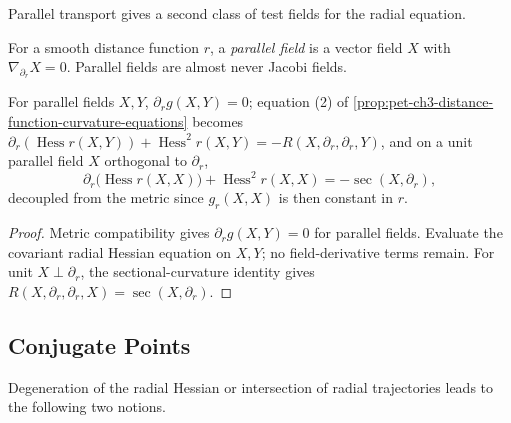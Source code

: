 Parallel transport gives a second class of test fields for the radial equation.

\begin{definition}
  \label{def:pet-ch3-parallel-field}
  \leanok
  For a smooth distance function $r$, a \emph{parallel field} is a vector field
  $X$ with $\nabla_{\partial_r}X=0$. Parallel fields are almost never Jacobi
  fields.
\end{definition}

\begin{proposition}
  \label{prop:pet-ch3-parallel-field-curvature-equation}
  \leanok
  For parallel fields $X,Y$, $\partial_rg(X,Y)=0$; equation (2) of
  \cref{prop:pet-ch3-distance-function-curvature-equations} becomes
  $\partial_r(\operatorname{Hess}r(X,Y))+\operatorname{Hess}^2r(X,Y)=-R(X,\partial_r,\partial_r,Y)$,
  and on a unit parallel field $X$ orthogonal to $\partial_r$,
  \[
    \partial_r\big(\operatorname{Hess}r(X,X)\big)+\operatorname{Hess}^2r(X,X)=-\sec(X,\partial_r),
  \]
  decoupled from the metric since $g_r(X,X)$ is then constant in $r$.
\end{proposition}
\begin{proof}
  \leanok
  \sketch
  Metric compatibility gives $\partial_rg(X,Y)=0$ for parallel fields. Evaluate
  the covariant radial Hessian equation on $X,Y$; no field-derivative terms remain.
  For unit $X\perp\partial_r$, the sectional-curvature identity gives
  $R(X,\partial_r,\partial_r,X)=\sec(X,\partial_r)$.
\end{proof}

\subsection{Conjugate Points}

Degeneration of the radial Hessian or intersection of radial trajectories leads
to the following two notions.

